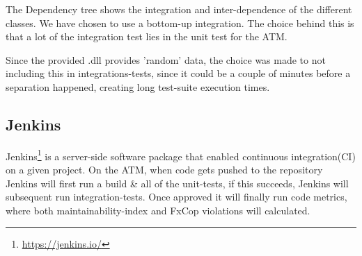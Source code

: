 	\pagebreak
	
	The Dependency tree shows the integration and inter-dependence of the different classes. We have chosen to use a bottom-up integration. The choice behind this is that a lot of the integration test lies in the unit test for the ATM. 
	
	Since the provided .dll provides 'random' data, the choice was made to not including this in integrations-tests, since it could be a couple of minutes before a separation happened, creating long test-suite execution times. 
	
	\subsection{Jenkins}
	Jenkins\footnote{\url{https://jenkins.io/}} is a server-side software package that enabled continuous integration(CI) on a given project. On the ATM, when code gets pushed to the repository Jenkins will first run a build \& all of the unit-tests, if this succeeds, Jenkins will subsequent run integration-tests. Once approved it will finally run code metrics, where both maintainability-index and FxCop violations will calculated.
	